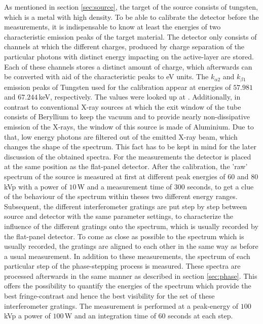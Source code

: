 As mentioned in section \ref{sec:source}, the target of the source consists of tungsten, which is a metal with high density. To be able to calibrate the detector before the measurements, it is indispensable to know at least the energies of two characteristic emission peaks of the target material. The detector only consists of channels at which the different charges, produced by charge separation of the particular photons with distinct energy impacting on the active-layer are stored. Each of these channels stores a distinct amount of charge, which afterwards can be converted  with aid of the characteristic peaks to eV units. The $k_{\alpha2}$ and $k_{\beta1}$ emission peaks of Tungsten used for the calibration appear at energies of $57.981$ and $67.244\,$keV, respectively. The values were looked up at \cite{Thompson}. Additionally, in contrast to conventional X-ray sources at which the exit window of the tube consists of Beryllium to keep the vacuum and to provide nearly non-dissipative emission of the X-rays, the window of this source is made of Aluminium. Due to that, low energy photons are filtered out of the emitted X-ray beam, which changes the shape of the spectrum. This fact has to be kept in mind for the later discussion of the obtained spectra. For the measurements the detector is placed at the same position as the flat-panel detector. After the calibration, the 'raw' spectrum of the source is measured at first at different peak energies of $60$ and $80\,$kVp with a power of $10\,$W and a measurement time of $300$ seconds, to get a clue of the behaviour of the spectrum within theses two different energy ranges. Subsequent, the different interferometer gratings are put step by step between source and detector with the same parameter settings, to characterize the influence of the different gratings onto the spectrum, which is usually recorded by the flat-panel detector. To come as close as possible to the spectrum which is usually recorded, the gratings are aligned to each other in the same way as before a usual measurement. In addition to these measurements, the spectrum of each particular step of the phase-stepping process is measured. These spectra are processed afterwards in the same manner as described in section \ref{sec:phase}. This offers the possibility to quantify the energies of the spectrum which provide the best fringe-contrast and hence the best visibility for the set of these interferometer gratings. The measurement is performed at a peak-energy of $100\,$kVp a power of $100\,$W and an integration time of $60$ seconds at each step.\\ 

